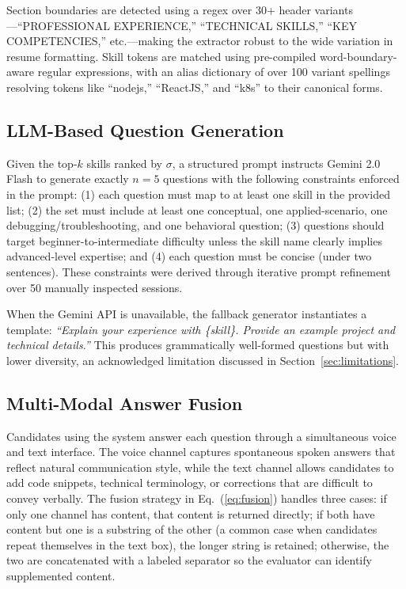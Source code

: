 \documentclass[conference]{IEEEtran}
\begin{document}
Section boundaries are detected using a regex over 30+ header variants—``PROFESSIONAL EXPERIENCE,'' ``TECHNICAL SKILLS,'' ``KEY COMPETENCIES,'' etc.—making the extractor robust to the wide variation in resume formatting. Skill tokens are matched using pre-compiled word-boundary-aware regular expressions, with an alias dictionary of over 100 variant spellings resolving tokens like ``nodejs,'' ``ReactJS,'' and ``k8s'' to their canonical forms.

\subsection{LLM-Based Question Generation}

Given the top-$k$ skills ranked by $\sigma$, a structured prompt instructs Gemini 2.0 Flash to generate exactly $n=5$ questions with the following constraints enforced in the prompt: (1) each question must map to at least one skill in the provided list; (2) the set must include at least one conceptual, one applied-scenario, one debugging/troubleshooting, and one behavioral question; (3) questions should target beginner-to-intermediate difficulty unless the skill name clearly implies advanced-level expertise; and (4) each question must be concise (under two sentences). These constraints were derived through iterative prompt refinement over 50 manually inspected sessions.

When the Gemini API is unavailable, the fallback generator instantiates a template: \textit{``Explain your experience with \{skill\}. Provide an example project and technical details.''} This produces grammatically well-formed questions but with lower diversity, an acknowledged limitation discussed in Section~\ref{sec:limitations}.

\subsection{Multi-Modal Answer Fusion}

Candidates using the system answer each question through a simultaneous voice and text interface. The voice channel captures spontaneous spoken answers that reflect natural communication style, while the text channel allows candidates to add code snippets, technical terminology, or corrections that are difficult to convey verbally. The fusion strategy in Eq.~(\ref{eq:fusion}) handles three cases: if only one channel has content, that content is returned directly; if both have content but one is a substring of the other (a common case when candidates repeat themselves in the text box), the longer string is retained; otherwise, the two are concatenated with a labeled separator so the evaluator can identify supplemented content.
\end{document}
